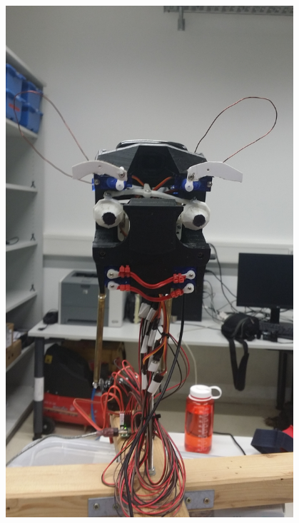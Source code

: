 \documentclass[12.5pt]{scrartcl}
\begin{document}
    \begin{center}
        \includegraphics[width=0.8\textwidth,height=0.2\textheight,keepaspectratio]{images/RoboFaceNeutral.jpg}
        \label{fig:RoboFaceNeutral}
    \end{center}
\end{document}
